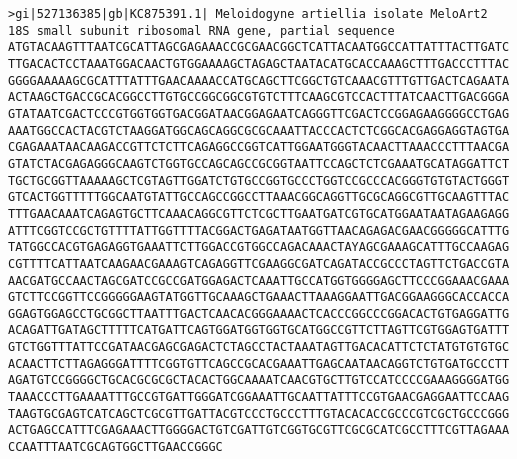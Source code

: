 \documentclass[11pt]{article}
\begin{document}
\begin{Verbatim}[commandchars=\\\{\}]
>gi|527136385|gb|KC875391.1| Meloidogyne artiellia isolate MeloArt2 18S small subunit ribosomal RNA gene, partial sequence
ATGTACAAGTTTAATCGCATTAGCGAGAAACCGCGAACGGCTCATTACAATGGCCATTATTTACTTGATC
TTGACACTCCTAAATGGACAACTGTGGAAAAGCTAGAGCTAATACATGCACCAAAGCTTTGACCCTTTAC
GGGGAAAAAGCGCATTTATTTGAACAAAACCATGCAGCTTCGGCTGTCAAACGTTTGTTGACTCAGAATA
ACTAAGCTGACCGCACGGCCTTGTGCCGGCGGCGTGTCTTTCAAGCGTCCACTTTATCAACTTGACGGGA
GTATAATCGACTCCCGTGGTGGTGACGGATAACGGAGAATCAGGGTTCGACTCCGGAGAAGGGGCCTGAG
AAATGGCCACTACGTCTAAGGATGGCAGCAGGCGCGCAAATTACCCACTCTCGGCACGAGGAGGTAGTGA
CGAGAAATAACAAGACCGTTCTCTTCAGAGGCCGGTCATTGGAATGGGTACAACTTAAACCCTTTAACGA
GTATCTACGAGAGGGCAAGTCTGGTGCCAGCAGCCGCGGTAATTCCAGCTCTCGAAATGCATAGGATTCT
TGCTGCGGTTAAAAAGCTCGTAGTTGGATCTGTGCCGGTGCCCTGGTCCGCCCACGGGTGTGTACTGGGT
GTCACTGGTTTTTGGCAATGTATTGCCAGCCGGCCTTAAACGGCAGGTTGCGCAGGCGTTGCAAGTTTAC
TTTGAACAAATCAGAGTGCTTCAAACAGGCGTTCTCGCTTGAATGATCGTGCATGGAATAATAGAAGAGG
ATTTCGGTCCGCTGTTTTATTGGTTTTACGGACTGAGATAATGGTTAACAGAGACGAACGGGGGCATTTG
TATGGCCACGTGAGAGGTGAAATTCTTGGACCGTGGCCAGACAAACTAYAGCGAAAGCATTTGCCAAGAG
CGTTTTCATTAATCAAGAACGAAAGTCAGAGGTTCGAAGGCGATCAGATACCGCCCTAGTTCTGACCGTA
AACGATGCCAACTAGCGATCCGCCGATGGAGACTCAAATTGCCATGGTGGGGAGCTTCCCGGAAACGAAA
GTCTTCCGGTTCCGGGGGAAGTATGGTTGCAAAGCTGAAACTTAAAGGAATTGACGGAAGGGCACCACCA
GGAGTGGAGCCTGCGGCTTAATTTGACTCAACACGGGAAAACTCACCCGGCCCGGACACTGTGAGGATTG
ACAGATTGATAGCTTTTTCATGATTCAGTGGATGGTGGTGCATGGCCGTTCTTAGTTCGTGGAGTGATTT
GTCTGGTTTATTCCGATAACGAGCGAGACTCTAGCCTACTAAATAGTTGACACATTCTCTATGTGTGTGC
ACAACTTCTTAGAGGGATTTTCGGTGTTCAGCCGCACGAAATTGAGCAATAACAGGTCTGTGATGCCCTT
AGATGTCCGGGGCTGCACGCGCGCTACACTGGCAAAATCAACGTGCTTGTCCATCCCCGAAAGGGGATGG
TAAACCCTTGAAAATTTGCCGTGATTGGGATCGGAAATTGCAATTATTTCCGTGAACGAGGAATTCCAAG
TAAGTGCGAGTCATCAGCTCGCGTTGATTACGTCCCTGCCCTTTGTACACACCGCCCGTCGCTGCCCGGG
ACTGAGCCATTTCGAGAAACTTGGGGACTGTCGATTGTCGGTGCGTTCGCGCATCGCCTTTCGTTAGAAA
CCAATTTAATCGCAGTGGCTTGAACCGGGC


\end{Verbatim}
\end{document}
